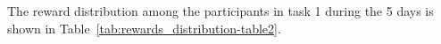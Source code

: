 \documentclass[conference]{IEEEtran}
\begin{document}


The reward distribution among the participants in task 1 during the 5 days is shown in Table~\ref{tab:rewards_distribution-table2}.
\end{document}
